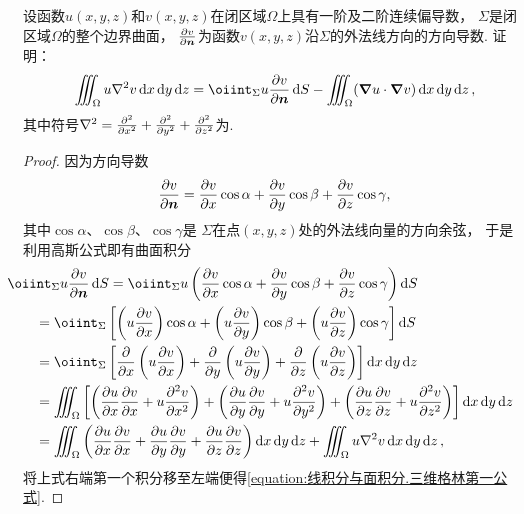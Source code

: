 \begin{example}[三维格林第一公式]
设函数\(u(x,y,z)\)和\(v(x,y,z)\)在闭区域\(\Omega\)上具有一阶及二阶连续偏导数，
\(\Sigma\)是闭区域\(\Omega\)的整个边界曲面，
\(\pdv{v}{\boldsymbol{n}}\)为函数\(v(x,y,z)\)沿\(\Sigma\)的外法线方向的方向导数.
证明：\begin{equation}\label{equation:线积分与面积分.三维格林第一公式}
	\iiint_\Omega u \laplacian{v} \dd{x}\dd{y}\dd{z}
	= \oiint_\Sigma u \pdv{v}{\vb{n}} \dd{S}
	- \iiint_\Omega (\grad u \cdot \grad v) \dd{x}\dd{y}\dd{z},
\end{equation}
其中符号\(\laplacian = \pdv[2]{x} + \pdv[2]{y} + \pdv[2]{z}\)为.
\begin{proof}
因为方向导数\[
	\pdv{v}{\boldsymbol{n}}
	= \pdv{v}{x} \cos\alpha
	+ \pdv{v}{y} \cos\beta
	+ \pdv{v}{z} \cos\gamma,
\]
其中\(\cos\alpha\)、\(\cos\beta\)、\(\cos\gamma\)是
\(\Sigma\)在点\((x,y,z)\)处的外法线向量的方向余弦，
于是利用高斯公式即有曲面积分\begin{align*}
	&\hspace{-20pt}\oiint_\Sigma u \pdv{v}{\vb{n}} \dd{S}
	= \oiint_\Sigma u \left(
			\pdv{v}{x} \cos\alpha
			+ \pdv{v}{y} \cos\beta
			+ \pdv{v}{z} \cos\gamma
		\right) \dd{S} \\
	&= \oiint_\Sigma \left[
			\left( u \pdv{v}{x} \right) \cos\alpha
			+ \left( u \pdv{v}{y} \right) \cos\beta
			+ \left( u \pdv{v}{z} \right) \cos\gamma
		\right] \dd{S} \\
	&= \oiint_\Sigma \left[
			\pdv{x} \left( u \pdv{v}{x} \right)
			+ \pdv{y} \left( u \pdv{v}{y} \right)
			+ \pdv{z} \left( u \pdv{v}{z} \right)
		\right] \dd{x}\dd{y}\dd{z} \\
	&= \iiint_\Omega \left[
			\left( \pdv{u}{x} \pdv{v}{x} + u \pdv[2]{v}{x} \right)
			+ \left( \pdv{u}{y} \pdv{v}{y} + u \pdv[2]{v}{y} \right)
			+ \left( \pdv{u}{z} \pdv{v}{z} + u \pdv[2]{v}{z} \right)
		\right] \dd{x}\dd{y}\dd{z} \\
	&= \iiint_\Omega \left(
			\pdv{u}{x} \pdv{v}{x}
			+ \pdv{u}{y} \pdv{v}{y}
			+ \pdv{u}{z} \pdv{v}{z}
		\right) \dd{x}\dd{y}\dd{z}
		+ \iiint_\Omega u \laplacian{v} \dd{x}\dd{y}\dd{z},
\end{align*}
将上式右端第一个积分移至左端便得\cref{equation:线积分与面积分.三维格林第一公式}.
\end{proof}
\end{example}

